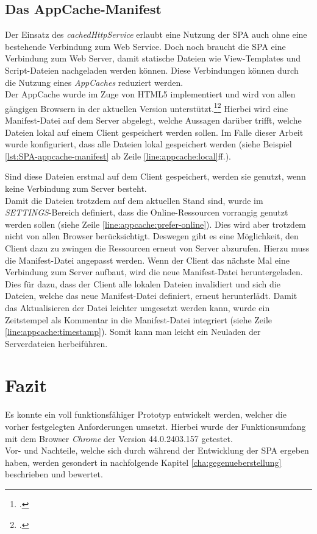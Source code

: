 \subsection{Das AppCache-Manifest}
\label{ssec:appcache-manifest}
Der Einsatz des \textit{cachedHttpService} erlaubt eine Nutzung der \ac{SPA} auch ohne eine bestehende Verbindung zum Web Service. Doch noch braucht die \ac{SPA} eine Verbindung zum Web Server, damit statische Dateien wie View-Templates und Script-Dateien nachgeladen werden können. Diese Verbindungen können durch die Nutzung eines \textit{AppCaches} reduziert werden. \\
Der AppCache wurde im Zuge von \gls{HTML5} implementiert und wird von allen gängigen Browsern in der aktuellen Version unterstützt.\footcite{online:AngularJs:indexedDB:w3c}\footcite{online:caniuse:appcache} Hierbei wird eine Manifest-Datei auf dem Server abgelegt, welche Aussagen darüber trifft, welche Dateien lokal auf einem Client gespeichert werden sollen. Im Falle dieser Arbeit wurde konfiguriert, dass alle Dateien lokal gespeichert werden (siehe Beispiel \ref{lst:SPA-appcache-manifest} ab Zeile \ref{line:appcache:local}ff.). 



Sind diese Dateien erstmal auf dem Client gespeichert, werden sie genutzt, wenn keine Verbindung zum Server besteht. \\
Damit die Dateien trotzdem auf dem aktuellen Stand sind, wurde im \textit{SETTINGS}-Bereich definiert, dass die Online-Ressourcen vorrangig genutzt werden sollen (siehe Zeile \ref{line:appcache:prefer-online}). Dies wird aber trotzdem nicht von allen Browser berücksichtigt. Deswegen gibt es eine Möglichkeit, den Client dazu zu zwingen  die Ressourcen erneut von Server abzurufen. Hierzu muss die Manifest-Datei angepasst werden. Wenn der Client das nächste Mal eine Verbindung zum Server aufbaut, wird die neue Manifest-Datei heruntergeladen. Dies für dazu, dass der Client alle lokalen Dateien invalidiert und sich die Dateien, welche das neue Manifest-Datei definiert, erneut herunterlädt. Damit das Aktualisieren der Datei leichter umgesetzt werden kann, wurde ein Zeitstempel als Kommentar in die Manifest-Datei integriert (siehe Zeile \ref{line:appcache:timestamp}). Somit kann man leicht ein Neuladen der Serverdateien herbeiführen. 
\section{Fazit}
Es konnte ein voll funktionsfähiger Prototyp entwickelt werden, welcher die vorher festgelegten Anforderungen umsetzt. Hierbei wurde der Funktionsumfang mit dem Browser \textit{Chrome} der Version 44.0.2403.157 getestet. \\
Vor- und Nachteile, welche sich durch während der Entwicklung der \ac{SPA} ergeben haben, werden gesondert in nachfolgende Kapitel \ref{cha:gegenueberstellung} beschrieben und bewertet. 

